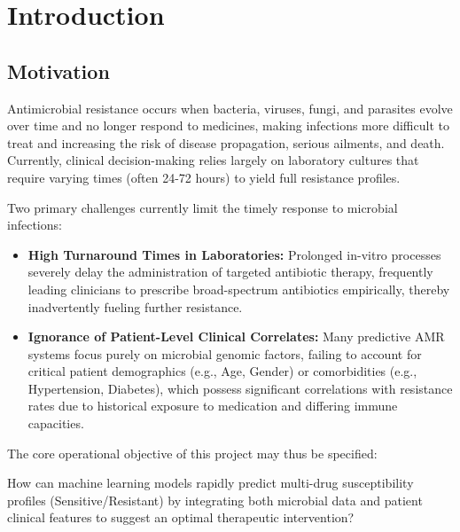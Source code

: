 \documentclass[12pt,a4paper]{report}
\begin{document}
\chapter{Introduction}
\thispagestyle{fancy}

\section{Motivation}

Antimicrobial resistance occurs when bacteria, viruses, fungi, and parasites evolve over time and no longer respond to medicines, making infections more difficult to treat and increasing the risk of disease propagation, serious ailments, and death. Currently, clinical decision-making relies largely on laboratory cultures that require varying times (often 24-72 hours) to yield full resistance profiles.

Two primary challenges currently limit the timely response to microbial infections:

\begin{itemize}[noitemsep, leftmargin=*]
  \item \textbf{High Turnaround Times in Laboratories:} Prolonged in-vitro processes severely delay the administration of targeted antibiotic therapy, frequently leading clinicians to prescribe broad-spectrum antibiotics empirically, thereby inadvertently fueling further resistance.
  \item \textbf{Ignorance of Patient-Level Clinical Correlates:} Many predictive AMR systems focus purely on microbial genomic factors, failing to account for critical patient demographics (e.g., Age, Gender) or comorbidities (e.g., Hypertension, Diabetes), which possess significant correlations with resistance rates due to historical exposure to medication and differing immune capacities.
\end{itemize}

The core operational objective of this project may thus be specified:

\begin{tcolorbox}[infobox, title=Core Research Problem]
  How can machine learning models rapidly predict multi-drug susceptibility profiles (Sensitive/Resistant) by integrating both microbial data and patient clinical features to suggest an optimal therapeutic intervention?
\end{tcolorbox}
\end{document}
